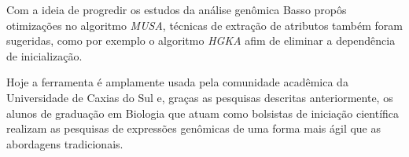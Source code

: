 Com a ideia de progredir os estudos da análise genômica Basso propôs otimizações no algoritmo \textit{MUSA}, técnicas de extração de atributos também foram sugeridas, como por exemplo o algoritmo \textit{HGKA} afim de eliminar a dependência de inicialização\cite{Basso:2015:UCS}.

Hoje a ferramenta é amplamente usada pela comunidade acadêmica da Universidade de Caxias do Sul e, graças as pesquisas descritas anteriormente, os alunos de graduação em Biologia que atuam como bolsistas de iniciação científica realizam as pesquisas de expressões genômicas de uma forma mais ágil que as abordagens tradicionais.
 




















